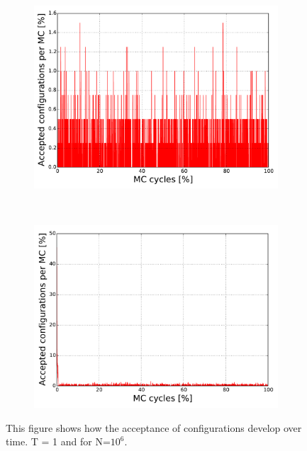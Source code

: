 \begin{figure}[H]
    \centering
    \begin{subfigure}{0.5\textwidth}
        \centering
        \includegraphics[width=\linewidth]{result/bilder/config/energy22-MC1000000T1-configN20}
        \caption{}
    \end{subfigure}%
    ~ 
    \begin{subfigure}{0.5\textwidth}
        \centering
        \includegraphics[width=\linewidth]{result/bilder/config/energy22-MC1000000T1-config-RNGN20}
        \caption{}
    \end{subfigure}
    \caption{This figure shows how the acceptance of configurations develop over time. T = 1 and for N=$10^6$. }
    \label{fig:config-T1}
\end{figure}

